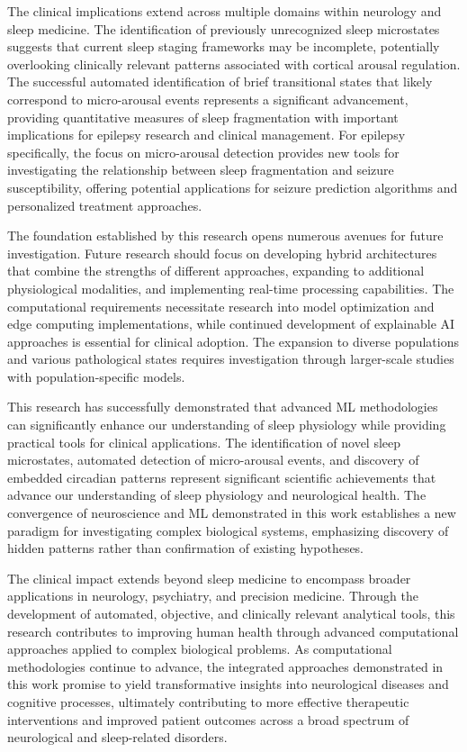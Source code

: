 \documentclass[a4paper,12pt,twoside]{article}
\begin{document}
The clinical implications extend across multiple domains within neurology and sleep medicine. The identification of previously unrecognized sleep microstates suggests that current sleep staging frameworks may be incomplete, potentially overlooking clinically relevant patterns associated with cortical arousal regulation. The successful automated identification of brief transitional states that likely correspond to micro-arousal events represents a significant advancement, providing quantitative measures of sleep fragmentation with important implications for epilepsy research and clinical management. For epilepsy specifically, the focus on micro-arousal detection provides new tools for investigating the relationship between sleep fragmentation and seizure susceptibility, offering potential applications for seizure prediction algorithms and personalized treatment approaches.

The foundation established by this research opens numerous avenues for future investigation. Future research should focus on developing hybrid architectures that combine the strengths of different approaches, expanding to additional physiological modalities, and implementing real-time processing capabilities. The computational requirements necessitate research into model optimization and edge computing implementations, while continued development of explainable AI approaches is essential for clinical adoption. The expansion to diverse populations and various pathological states requires investigation through larger-scale studies with population-specific models.

This research has successfully demonstrated that advanced ML methodologies can significantly enhance our understanding of sleep physiology while providing practical tools for clinical applications. The identification of novel sleep microstates, automated detection of micro-arousal events, and discovery of embedded circadian patterns represent significant scientific achievements that advance our understanding of sleep physiology and neurological health. The convergence of neuroscience and ML demonstrated in this work establishes a new paradigm for investigating complex biological systems, emphasizing discovery of hidden patterns rather than confirmation of existing hypotheses.

The clinical impact extends beyond sleep medicine to encompass broader applications in neurology, psychiatry, and precision medicine. Through the development of automated, objective, and clinically relevant analytical tools, this research contributes to improving human health through advanced computational approaches applied to complex biological problems. As computational methodologies continue to advance, the integrated approaches demonstrated in this work promise to yield transformative insights into neurological diseases and cognitive processes, ultimately contributing to more effective therapeutic interventions and improved patient outcomes across a broad spectrum of neurological and sleep-related disorders.

\printbibliography
\end{document}
